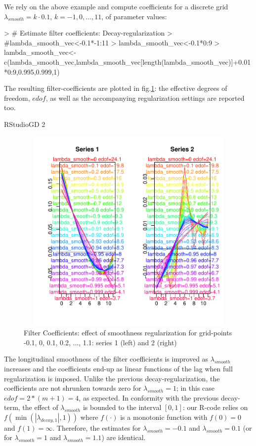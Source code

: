 \documentclass[a4paper]{book}
\begin{document}
We rely on the above example and compute coefficients for a discrete grid $\lambda_{smooth}=k\cdot 0.1$, $k=-1,0,...,11$, of parameter values:  
\begin{Schunk}
\begin{Sinput}
> # Estimate filter coefficients: Decay-regularization
> #lambda_smooth_vec<-0.1*-1:11
> lambda_smooth_vec<-0.1*0:9
> lambda_smooth_vec<-c(lambda_smooth_vec,lambda_smooth_vec[length(lambda_smooth_vec)]+0.01*0:9,0.995,0.999,1)
\end{Sinput}
\end{Schunk}
The resulting filter-coefficients  are plotted in fig.\ref{z_mdfa_ms_reg_smooth_1}: the effective degrees of freedom, $edof$, as well as the accompanying regularization settings are reported too.
\begin{Schunk}
\begin{Soutput}
RStudioGD 
        2 
\end{Soutput}
\end{Schunk}
\begin{figure}[H]\begin{center}\includegraphics[height=4in, width=6in]{z_mdfa_ms_reg_smooth_1}\caption{Filter Coefficients: effect of smoothness regularization for grid-points -0.1, 0, 0.1, 0.2, ..., 1.1: series 1 (left) and 2 (right)\label{z_mdfa_ms_reg_smooth_1}}\end{center}\end{figure}The longitudinal smoothness of the filter coefficients is improved as $\lambda_{smooth}$ increases and the coefficients end-up as linear functions of the lag when full regularization is imposed. Unlike the previous decay-regularization, the coefficients are not shrunken towards zero for $\lambda_{smooth}=1$; in this case $edof=2*(m+1)=4$, as expected. In conformity with the previous decay-term, the effect of $\lambda_{smooth}$ is bounded to the interval $[0,1]$: our R-code relies on $f(\min(|\lambda_{decay,1}|,1))$ where $f(\cdot)$ is a monotonic function with $f(0)=0$ and $f(1)=\infty$. Therefore, the estimates for $\lambda_{smooth}=-0.1$ and $\lambda_{smooth}=0.1$ (or for $\lambda_{smooth}=1$ and $\lambda_{smooth}=1.1$) are identical.  
\end{document}
